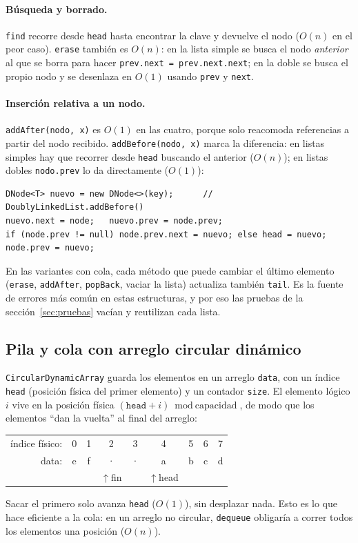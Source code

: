 \documentclass[11pt,a4paper]{article}
\newcommand{\Oone}{$O(1)$}
\newcommand{\On}{$O(n)$}
\begin{document}
\paragraph{Búsqueda y borrado.} \texttt{find} recorre desde \texttt{head} hasta encontrar la clave y
devuelve el nodo (\On{} en el peor caso). \texttt{erase} también es \On{}: en la lista simple se busca el
nodo \emph{anterior} al que se borra para hacer \texttt{prev.next = prev.next.next}; en la doble se busca
el propio nodo y se desenlaza en \Oone{} usando \texttt{prev} y \texttt{next}.

\paragraph{Inserción relativa a un nodo.} \texttt{addAfter(nodo, x)} es \Oone{} en las cuatro, porque
solo reacomoda referencias a partir del nodo recibido. \texttt{addBefore(nodo, x)} marca la diferencia:
en listas simples hay que recorrer desde \texttt{head} buscando el anterior (\On); en listas dobles
\texttt{nodo.prev} lo da directamente (\Oone):
\begin{lstlisting}
DNode<T> nuevo = new DNode<>(key);      // DoublyLinkedList.addBefore()
nuevo.next = node;   nuevo.prev = node.prev;
if (node.prev != null) node.prev.next = nuevo; else head = nuevo;
node.prev = nuevo;
\end{lstlisting}

En las variantes con cola, cada método que puede cambiar el último elemento (\texttt{erase},
\texttt{addAfter}, \texttt{popBack}, vaciar la lista) actualiza también \texttt{tail}. Es la fuente de
errores más común en estas estructuras, y por eso las pruebas de la sección~\ref{sec:pruebas} vacían y
reutilizan cada lista.

\subsection{Pila y cola con arreglo circular dinámico}

\texttt{CircularDynamicArray} guarda los elementos en un arreglo \texttt{data}, con un índice
\texttt{head} (posición física del primer elemento) y un contador \texttt{size}. El elemento lógico
$i$ vive en la posición física $(\texttt{head}+i) \bmod \text{capacidad}$, de modo que los elementos
``dan la vuelta'' al final del arreglo:
\begin{center}\small\ttfamily
\begin{tabular}{r*{8}{c}}
índice físico: & 0 & 1 & 2 & 3 & 4 & 5 & 6 & 7 \\
data:          & e & f & · & · & a & b & c & d \\
               &   &   & $\uparrow$fin & & $\uparrow$head & & &
\end{tabular}
\end{center}
Sacar el primero solo avanza \texttt{head} (\Oone), sin desplazar nada. Esto es lo que hace eficiente a
la cola: en un arreglo no circular, \texttt{dequeue} obligaría a correr todos los elementos una
posición (\On).
\end{document}
